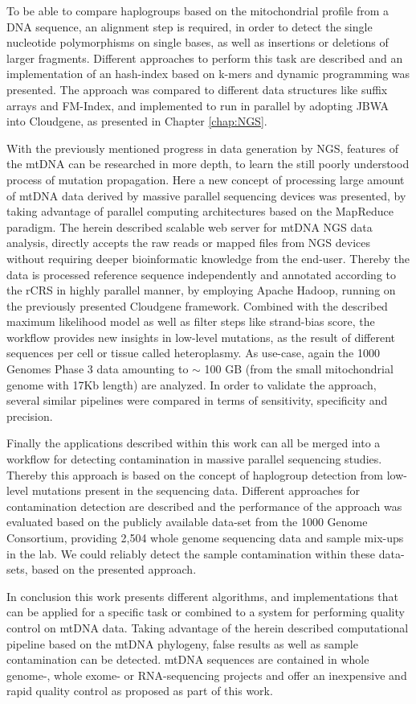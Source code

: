 To be able to compare haplogroups based on the mitochondrial profile from a DNA sequence, an alignment step is required, in order to detect the single nucleotide polymorphisms on single bases, as well as insertions or deletions of larger fragments. Different approaches to perform this task are described and an implementation of an hash-index based on k-mers and dynamic programming was presented. The approach was compared to different data structures like suffix arrays and FM-Index, and implemented to run in parallel by adopting JBWA into Cloudgene, as presented in Chapter \ref{chap:NGS}. 

With the previously mentioned progress in data generation by NGS, features of the mtDNA can be researched in more depth, to learn the still poorly understood process of mutation propagation. Here a new concept of processing large amount of mtDNA data derived by massive parallel sequencing devices was presented, by taking advantage of parallel computing architectures based on the MapReduce paradigm. The herein described scalable web server for mtDNA NGS data analysis, directly accepts the raw reads or mapped files from NGS devices without requiring deeper bioinformatic knowledge from the end-user. Thereby the data is processed reference sequence independently and annotated according to the rCRS in highly parallel manner, by employing Apache Hadoop, running on the previously presented Cloudgene framework. Combined with the described maximum likelihood model as well as filter steps like strand-bias score, the workflow provides new insights in low-level mutations, as the result of different sequences per cell or tissue called heteroplasmy. As use-case, again the 1000 Genomes Phase 3 data amounting to $\sim$ 100 GB (from the small mitochondrial genome with 17Kb length) are analyzed. In order to validate the approach, several similar pipelines were compared in terms of sensitivity, specificity and precision. 

Finally the applications described within this work can all be merged into a workflow for detecting contamination in massive parallel sequencing studies. Thereby this approach is based on the concept of haplogroup detection from low-level mutations present in the sequencing data. Different approaches for contamination detection are described and the performance of the approach was evaluated based on the publicly available data-set from the 1000 Genome Consortium, providing 2,504 whole genome sequencing data and sample mix-ups in the lab. We could reliably detect the sample contamination within these data-sets, based on the presented approach.

In conclusion this work presents different algorithms, and implementations that can be applied for a specific task or combined to a system for performing quality control on mtDNA data. Taking advantage of the herein described computational pipeline based on the mtDNA phylogeny, false results as well as sample contamination can be detected. mtDNA sequences are contained in whole genome-, whole exome-  or RNA-sequencing projects and offer an inexpensive and rapid quality control as proposed as part of this work.




